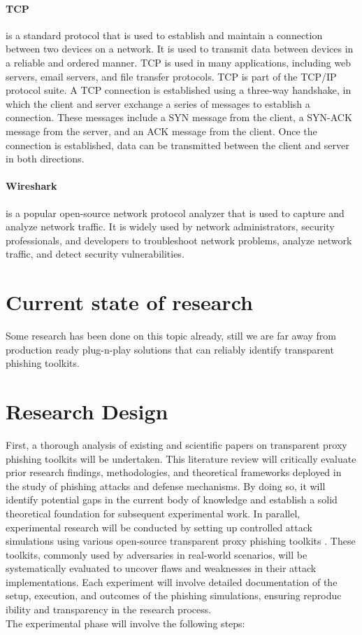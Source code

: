\documentclass[12pt]{scrbook}
\begin{document}
\paragraph{TCP} is a standard protocol that is used to establish and maintain a connection between
two devices on a network. It is used to transmit data between devices in a 
reliable and ordered manner. TCP is used in many applications, including web servers,
email servers, and file transfer protocols. TCP is part of the TCP/IP protocol suite.
A TCP connection is established using a three-way handshake, in which the client and server
exchange a series of messages to establish a connection. These messages include a SYN message
from the client, a SYN-ACK message from the server, and an ACK message from the client.
Once the connection is established, data can be transmitted between the client and server in both directions.

\paragraph{Wireshark} is a popular open-source network protocol
analyzer that is used to capture and analyze network traffic. It is widely used
by network administrators, security professionals, and developers to
troubleshoot network problems, analyze network traffic, and detect security
vulnerabilities.

\newpage \section{Current state of research}
Some research has been done on this topic already, still we are far away from production ready plug-n-play solutions that can
reliably identify transparent phishing toolkits.

\section{Research Design} 
First, a thorough analysis of existing and scientific papers on transparent proxy
 phishing toolkits will be undertaken. This literature review will critically
 evaluate prior research findings, methodologies, and theoretical frameworks
 deployed in the study of phishing attacks and defense mechanisms. By doing
 so, it will identify potential gaps in the current body of knowledge and establish
 a solid theoretical foundation for subsequent experimental work.
In parallel, experimental research will be conducted by setting up controlled
 attack simulations using various open-source transparent proxy phishing toolkits
. These toolkits, commonly used by adversaries in real-world scenarios, will
 be systematically evaluated to uncover flaws and weaknesses in their attack
 implementations. Each experiment will involve detailed documentation of the
 setup, execution, and outcomes of the phishing simulations, ensuring reproduc
ibility and transparency in the research process.\\
The experimental phase will involve the following steps:
\end{document}
